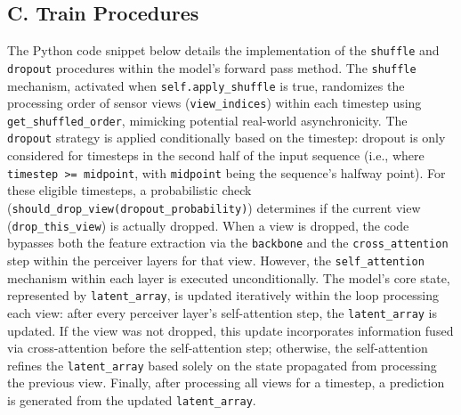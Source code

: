 \subsection*{C. Train Procedures} \label{Appendix:TrainProcedures}

The Python code snippet below details the implementation of the \texttt{shuffle} and \texttt{dropout} procedures within the model's forward pass method. The \texttt{shuffle} mechanism, activated when \texttt{self.apply\_shuffle} is true, randomizes the processing order of sensor views (\texttt{view\_indices}) within each timestep using \texttt{get\_shuffled\_order}, mimicking potential real-world asynchronicity. The \texttt{dropout} strategy is applied conditionally based on the timestep: dropout is only considered for timesteps in the second half of the input sequence (i.e., where \texttt{timestep >= midpoint}, with \texttt{midpoint} being the sequence's halfway point). For these eligible timesteps, a probabilistic check (\texttt{should\_drop\_view(dropout\_probability)}) determines if the current view (\texttt{drop\_this\_view}) is actually dropped. When a view is dropped, the code bypasses both the feature extraction via the \texttt{backbone} and the \texttt{cross\_attention} step within the perceiver layers for that view. However, the \texttt{self\_attention} mechanism within each layer is executed unconditionally. The model's core state, represented by \texttt{latent\_array}, is updated iteratively within the loop processing each view: after every perceiver layer's self-attention step, the \texttt{latent\_array} is updated. If the view was not dropped, this update incorporates information fused via cross-attention before the self-attention step; otherwise, the self-attention refines the \texttt{latent\_array} based solely on the state propagated from processing the previous view. Finally, after processing all views for a timestep, a prediction is generated from the updated \texttt{latent\_array}.


